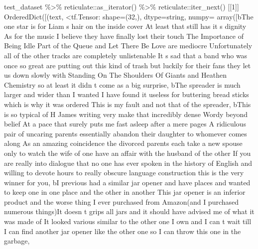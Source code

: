 \documentclass[
]{article}
\newenvironment{Shaded}{}{}
\newcommand{\AttributeTok}[1]{\textcolor[rgb]{0.49,0.56,0.16}{#1}}
\newcommand{\DecValTok}[1]{\textcolor[rgb]{0.25,0.63,0.44}{#1}}
\newcommand{\FunctionTok}[1]{\textcolor[rgb]{0.02,0.16,0.49}{#1}}
\newcommand{\NormalTok}[1]{#1}
\newcommand{\SpecialCharTok}[1]{\textcolor[rgb]{0.25,0.44,0.63}{#1}}
\newcommand{\StringTok}[1]{\textcolor[rgb]{0.25,0.44,0.63}{#1}}
\begin{document}
\begin{Shaded}
\begin{Highlighting}[]
\NormalTok{test\_dataset }\SpecialCharTok{\%\textgreater{}\%}
\NormalTok{    reticulate}\SpecialCharTok{::}\FunctionTok{as\_iterator}\NormalTok{() }\SpecialCharTok{\%\textgreater{}\%}
\NormalTok{    reticulate}\SpecialCharTok{::}\FunctionTok{iter\_next}\NormalTok{()}
\NormalTok{[[}\DecValTok{1}\NormalTok{]]}
\FunctionTok{OrderedDict}\NormalTok{([(}\StringTok{\textquotesingle{}text\textquotesingle{}}\NormalTok{, }\SpecialCharTok{\textless{}}\NormalTok{tf.Tensor}\SpecialCharTok{:} \AttributeTok{shape=}\NormalTok{(}\DecValTok{32}\NormalTok{,), }\AttributeTok{dtype=}\NormalTok{string, }\AttributeTok{numpy=}
\FunctionTok{array}\NormalTok{([b}\StringTok{\textquotesingle{}The one star is for Liam s hair on the inside cover At least that still has it s dignity As for the music I believe they have finally lost their touch The Importance of Being Idle Part of the Queue and Let There Be Love are mediocre Unfortunately all of the other tracks are completely unlistenable It s sad that a band who was once so great are putting out this kind of trash but luckily for their fans they let us down slowly with Standing On The Shoulders Of Giants and Heathen Chemistry so at least it didn t come as a big surprise\textquotesingle{}}\NormalTok{,}
\NormalTok{       b}\StringTok{\textquotesingle{}The spreader is much larger and wider than I wanted I have found it useless for buttering bread sticks which is why it was ordered This is my fault and not that of the spreader\textquotesingle{}}\NormalTok{,}
\NormalTok{       b}\StringTok{\textquotesingle{}This is so typical of H James writing very make that incredibly dense Wordy beyond belief At a pace that surely puts me fast asleep after a mere pages A ridiculous pair of uncaring parents essentially abandon their daughter to whomever comes along As an amazing coincidence the divorced parents each take a new spouse only to watch the wife of one have an affair with the husband of the other If you are really into dialogue that no one has ever spoken in the history of English and willing to devote hours to really obscure language construction this is the very winner for you\textquotesingle{}}\NormalTok{,}
\NormalTok{       b}\StringTok{\textquotesingle{}I previous had a similar jar opener and have places and wanted to keep one in one place and the other in another This jar opener is an inferior product and the worse thing I ever purchased from Amazon(and I purchased numerous things)It doesn t grips all jars and it should have advised me of what it was made of It looked various similar to the other one I own and I can t wait till I can find another jar opener like the other one so I can throw this one in the garbage\textquotesingle{}}\NormalTok{,}

\end{Highlighting}
\end{Shaded}
\end{document}
